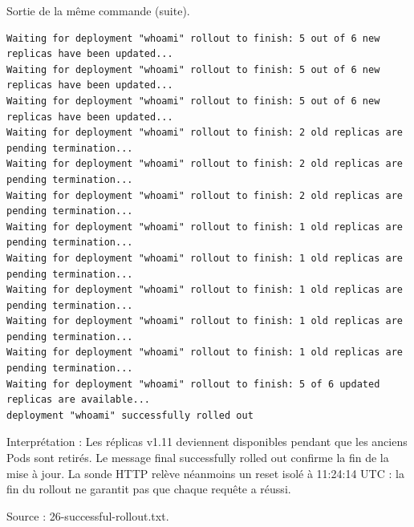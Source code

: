 \documentclass[11pt,a4paper]{article}
\begin{document}
\par\medskip\noindent\begin{minipage}{\linewidth}
Sortie de la même commande (suite).

\par\vspace{4pt}\noindent\begin{minipage}{\linewidth}
\begin{Verbatim}[breaklines=true,breakanywhere=true,fontsize=\footnotesize,frame=single,framesep=8pt,rulecolor=\color{teal}]
Waiting for deployment "whoami" rollout to finish: 5 out of 6 new replicas have been updated...
Waiting for deployment "whoami" rollout to finish: 5 out of 6 new replicas have been updated...
Waiting for deployment "whoami" rollout to finish: 5 out of 6 new replicas have been updated...
Waiting for deployment "whoami" rollout to finish: 2 old replicas are pending termination...
Waiting for deployment "whoami" rollout to finish: 2 old replicas are pending termination...
Waiting for deployment "whoami" rollout to finish: 2 old replicas are pending termination...
Waiting for deployment "whoami" rollout to finish: 1 old replicas are pending termination...
Waiting for deployment "whoami" rollout to finish: 1 old replicas are pending termination...
Waiting for deployment "whoami" rollout to finish: 1 old replicas are pending termination...
Waiting for deployment "whoami" rollout to finish: 1 old replicas are pending termination...
Waiting for deployment "whoami" rollout to finish: 1 old replicas are pending termination...
Waiting for deployment "whoami" rollout to finish: 5 of 6 updated replicas are available...
deployment "whoami" successfully rolled out
\end{Verbatim}
\end{minipage}\par\vspace{6pt}

Interprétation : Les réplicas v1.11 deviennent disponibles pendant que les anciens Pods sont retirés. Le message final successfully rolled out confirme la fin de la mise à jour. La sonde HTTP relève néanmoins un reset isolé à 11:24:14 UTC : la fin du rollout ne garantit pas que chaque requête a réussi.

{\footnotesize\color{teal} Source : 26-successful-rollout.txt.\par}
\end{minipage}\par\medskip
\end{document}

